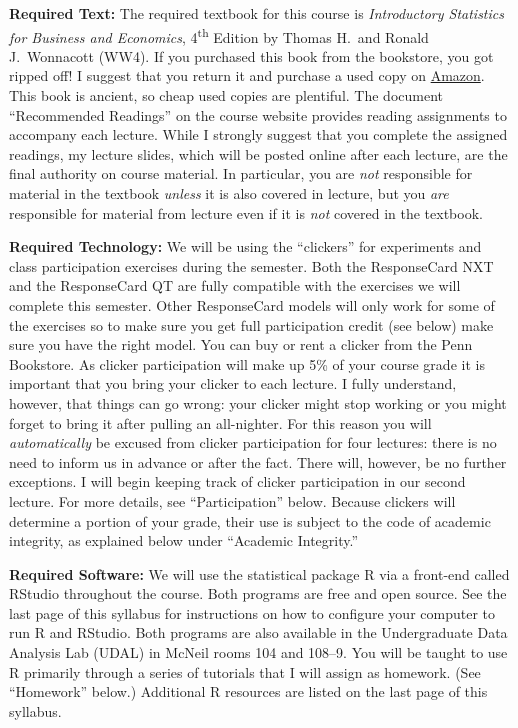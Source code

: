 \documentclass[11pt, letterpaper]{article}
\begin{document}
\medskip

\noindent \textbf{Required Text:} 
The required textbook for this course is \emph{Introductory Statistics for Business and Economics}, 4\textsuperscript{th} Edition by Thomas H.\ and Ronald J.\ Wonnacott (WW4). 
If you purchased this book from the bookstore, you got ripped off! I suggest that you return it and purchase a used copy on \href{http://tinyurl.com/ECON103-2013A}{Amazon}.
This book is ancient, so cheap used copies are plentiful.
The document ``Recommended Readings'' on the course website provides reading assignments to accompany each lecture.
While I strongly suggest that you complete the assigned readings, my lecture slides, which will be posted online after each lecture, are the final authority on course material. 
In particular, you are \emph{not} responsible for material in the textbook \emph{unless} it is also covered in lecture, but you \emph{are} responsible for material from lecture even if it is \emph{not} covered in the textbook.

\medskip


\noindent \textbf{Required Technology: } 
We will be using the ``clickers'' for experiments and class participation exercises during the semester.
Both the ResponseCard NXT and the ResponseCard QT are fully compatible with the exercises we will complete this semester.
Other ResponseCard models will only work for some of the exercises so to make sure you get full participation credit (see below) make sure you have the right model.
You can buy or rent a clicker from the Penn Bookstore.
As clicker participation will make up 5\% of your course grade it is important that you bring your clicker to each lecture. 
I fully understand, however, that things can go wrong: your clicker might stop working or you might forget to bring it after pulling an all-nighter.
For this reason you will \emph{automatically} be excused from clicker participation for four lectures: there is no need to inform us in advance or after the fact. There will, however, be no further exceptions. 
I will begin keeping track of clicker participation in our second lecture. For more details, see ``Participation'' below. 
Because clickers will determine a portion of your grade, their use is subject to the code of academic integrity, as explained below under ``Academic Integrity.'' 

\newpage


\noindent \textbf{Required Software:} 
We will use the statistical package R via a front-end called RStudio throughout the course. 
Both programs are free and open source. See the last page of this syllabus for instructions on how to configure your computer to run R and RStudio. Both programs are also available in the Undergraduate Data Analysis Lab (UDAL) in McNeil rooms 104 and 108--9. 
You will be taught to use R primarily through a series of tutorials that I will assign as homework. (See ``Homework'' below.)  
Additional R resources are listed on the last page of this syllabus.
\end{document}
